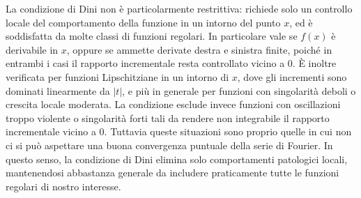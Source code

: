 \documentclass[a4paper,12pt]{report}
\begin{document}
La condizione di Dini non è particolarmente restrittiva: richiede solo un controllo locale del comportamento della funzione in un intorno del punto $x$, ed è soddisfatta da molte classi di funzioni regolari. In particolare vale se $f(x)$ è derivabile in $x$, oppure se ammette derivate destra e sinistra finite, poiché in entrambi i casi il rapporto incrementale resta controllato vicino a $0$. È inoltre verificata per funzioni Lipschitziane in un intorno di $x$, dove gli incrementi sono dominati linearmente da $|t|$, e più in generale per funzioni con singolarità deboli o crescita locale moderata. La condizione esclude invece funzioni con oscillazioni troppo violente o singolarità forti tali da rendere non integrabile il rapporto incrementale vicino a $0$. Tuttavia queste situazioni sono proprio quelle in cui non ci si può aspettare una buona convergenza puntuale della serie di Fourier. In questo senso, la condizione di Dini elimina solo comportamenti patologici locali, mantenendosi abbastanza generale da includere praticamente tutte le funzioni regolari di nostro interesse.
\end{document}
